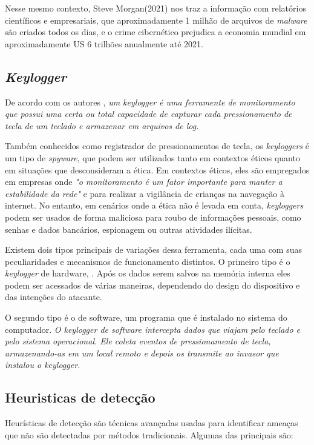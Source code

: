 \documentclass[12pt]{article}
\begin{document}
Nesse mesmo contexto, Steve Morgan(2021) nos traz a informação com relatórios científicos e empresariais, que aproximadamente 1 milhão de arquivos de \textit{malware} são criados todos os dias, e o crime cibernético prejudica a economia mundial em aproximadamente US 6 trilhões anualmente até 2021.

\subsection{\textit{Keylogger}}
De acordo com os autores \citep{wajahat2019novel}, \textit{um \textit{keylogger} é uma ferramente de monitoramento que possui uma certa ou total capacidade de capturar cada pressionamento de tecla de um teclado e armazenar em arquivos de log.}

Também conhecidos como registrador de pressionamentos de tecla, os \textit{keyloggers} é um tipo de \textit{spyware}, que podem ser utilizados tanto em contextos éticos quanto em situações que desconsideram a ética. Em contextos éticos, eles são empregados em empresas onde \textit{"o monitoramento é um fator importante para manter a estabilidade da rede"} \citep{tuli2013system} e para realizar a vigilância de crianças na navegação à internet. No entanto, em cenários onde a ética não é levada em conta, \textit{keyloggers} podem ser usados de forma maliciosa para roubo de informações pessoais, como senhas e dados bancários, espionagem ou outras atividades ilícitas.

Existem dois tipos principais de variações dessa ferramenta, cada uma com suas peculiaridades e mecanismos de funcionamento distintos. O primeiro tipo é o \textit{keylogger} de hardware, \textit{}\citep{singh2021keylogger}. Após os dados serem salvos na memória interna eles podem ser acessados de várias maneiras, dependendo do design do dispositivo e das intenções do atacante.

O segundo tipo é o de software, um programa que é instalado no sistema do computador. \textit{O keylogger de software intercepta dados que viajam pelo teclado e pelo sistema operacional. Ele coleta eventos de pressionamento de tecla, armazenando-as em um local remoto e depois os transmite ao invasor que instalou o keylogger.} \citep{ahmed2014survey}

\subsection{Heuristicas de detecção}
Heurísticas de detecção são técnicas avançadas usadas para identificar ameaças que não são detectadas por métodos tradicionais. Algumas das principais são:
\end{document}
